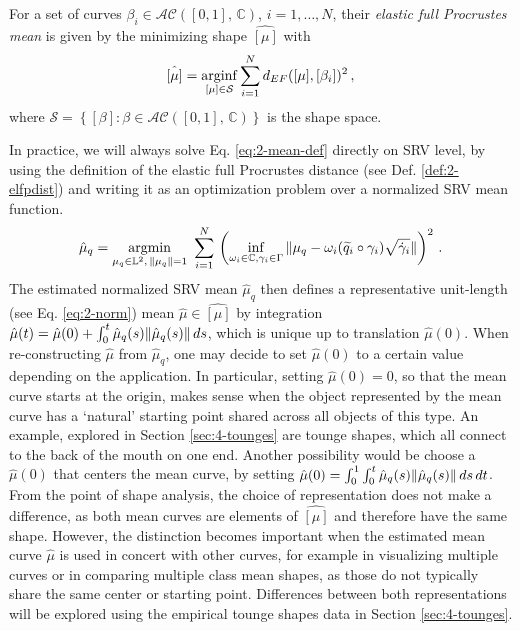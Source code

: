 \begin{definition}
  \label{def:2-mean}
  For a set of curves $\beta_i \in \mathcal{AC}([0,1],\, \mathbb{C})$, $i = 1,\dots,N$,  their \emph{elastic full Procrustes mean} is given by the minimizing shape $\hat{[\mu]}$ with
  \begin{equation}
    \label{eq:2-mean-def}
    \hat{[\mu]} = \operatorname*{arginf}_{[\mu] \in \mathcal{S}} \sum_{i=1}^N d_{EF}([\mu], [\beta_i])^2\,,
  \end{equation}
  where $\mathcal{S} = \left\{ [\beta] : \beta \in \mathcal{AC}([0,1],\,\mathbb{C}) \right\}$ is the shape space.
\end{definition}

\noindent In practice, we will always solve Eq. \ref{eq:2-mean-def} directly on SRV level, by using the definition of the elastic full Procrustes distance (see Def. \ref{def:2-elfpdist}) and writing it as an optimization problem over a normalized SRV mean function.
\begin{equation}
  \label{eq:2-mean-def-srv}
  \hat\mu_q = \operatorname*{argmin}_{\mu_q \in \mathbb{L}^2,\,\lVert\mu_q\rVert = 1}\,\,
  \sum_{i=1}^N \, \left( \inf_{\omega_i \in \mathbb{C}, \gamma_i \in \Gamma} \,
    \lVert\mu_q - \omega_i (\widetilde q_i \circ \gamma_i) \sqrt{\dot\gamma_i}\rVert \right)^2\,.
\end{equation}
The estimated normalized SRV mean $\hat{\mu}_q$ then defines a representative unit-length (see Eq. \ref{eq:2-norm}) mean $\hat{\mu} \in \hat{[\mu]}$ by integration $\hat\mu(t) = \hat\mu(0) + \int_0^t \hat\mu_q(s) \lVert\hat\mu_q(s)\rVert\,ds$, which is unique up to translation $\hat\mu(0)$.
When re-constructing $\hat\mu$ from $\hat\mu_q$, one may decide to set $\hat\mu(0)$ to a certain value depending on the application.
In particular, setting $\hat\mu(0) = 0$, so that the mean curve starts at the origin, makes sense when the object represented by the mean curve has a \enquote*{natural} starting point shared across all objects of this type.
An example, explored in Section \ref{sec:4-tounges} are tounge shapes, which all connect to the back of the mouth on one end.
Another possibility would be choose a $\hat\mu(0)$ that centers the mean curve, by setting $\hat\mu(0) = \int_0^1 \int_0^t \hat\mu_q(s) \lVert \hat\mu_q(s)\rVert\,ds\,dt$.
From the point of shape analysis, the choice of representation does not make a difference, as both mean curves are elements of $\hat{[\mu]}$ and therefore have the same shape.
However, the distinction becomes important when the estimated mean curve $\hat\mu$ is used in concert with other curves, for example in visualizing multiple curves or in comparing multiple class mean shapes, as those do not typically share the same center or starting point.
Differences between both representations will be explored using the empirical tounge shapes data in Section \ref{sec:4-tounges}.

